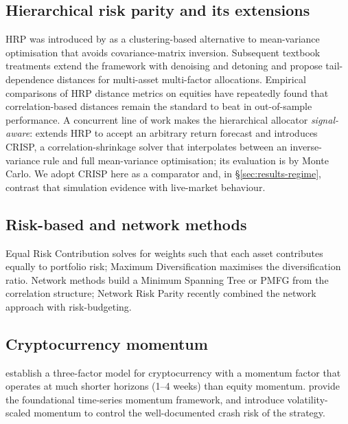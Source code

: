 \documentclass[11pt,a4paper]{article}
\begin{document}
\subsection{Hierarchical risk parity and its extensions}
HRP was introduced by \citet{lopezdeprado2016hrp} as a clustering-based
alternative to mean-variance optimisation that avoids covariance-matrix
inversion. Subsequent textbook treatments \citep{lopezdeprado2018afml,
lopezdeprado2020mlam} extend the framework with denoising and detoning
and propose tail-dependence distances \citep{lohre2020tailhrp} for
multi-asset multi-factor allocations. Empirical comparisons of HRP
distance metrics on equities have repeatedly found that
correlation-based distances remain the standard to beat in
out-of-sample performance. A concurrent line of work makes the
hierarchical allocator \emph{signal-aware}: \citet{wuebben2026crisp}
extends HRP to accept an arbitrary return forecast and introduces
CRISP, a correlation-shrinkage solver that interpolates between an
inverse-variance rule and full mean-variance optimisation; its
evaluation is by Monte Carlo. We adopt CRISP here as a comparator and,
in \S\ref{sec:results-regime}, contrast that simulation evidence with
live-market behaviour.

\subsection{Risk-based and network methods}
Equal Risk Contribution \citep{maillard2010erc} solves for weights such
that each asset contributes equally to portfolio risk; Maximum
Diversification \citep{choueifaty2008maxdiv} maximises the
diversification ratio. Network methods build a Minimum Spanning Tree
\citep{mantegna1999mst} or PMFG \citep{tumminello2005pmfg} from the
correlation structure; Network Risk Parity \citep{ciciretti2024nrp}
recently combined the network approach with risk-budgeting.

\subsection{Cryptocurrency momentum}
\citet{liu2022cryptofactors} establish a three-factor model for
cryptocurrency with a momentum factor that operates at much shorter
horizons (1--4 weeks) than equity momentum. \citet{moskowitz2012tsmom}
provide the foundational time-series momentum framework, and
\citet{barroso2015momentum} introduce volatility-scaled momentum to
control the well-documented crash risk of the strategy.
\end{document}
